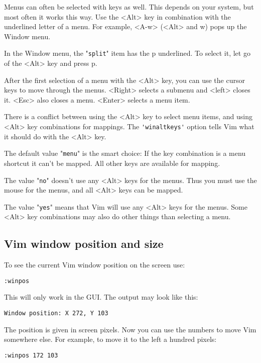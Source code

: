 Menus can often be selected with keys as well.
This depends on your system, but most often it works this way.
Use the <Alt> key in combination with the underlined letter of a menu.
For example, <A-w> (<Alt> and w) pops up the Window menu.

In the Window menu, the "\verb!split!" item has the p underlined.
To select it, let go of the <Alt> key and press p.

After the first selection of a menu with the <Alt> key, you can use the cursor keys to move through the menus.
<Right> selects a submenu and <left> closes it.
<Esc> also closes a menu.
<Enter> selects a menu item.

There is a conflict between using the <Alt> key to select menu items, and using <Alt> key combinations for mappings.
The \verb!'winaltkeys'! option tells Vim what it should do with the <Alt> key.

The default value "\verb!menu!" is the smart choice: If the key combination is a menu shortcut it can't be mapped.
All other keys are available for mapping.

The value "\verb!no!" doesn't use any <Alt> keys for the menus.
Thus you must use the mouse for the menus, and all <Alt> keys can be mapped.

The value "\verb!yes!" means that Vim will use any <Alt> keys for the menus.
Some <Alt> key combinations may also do other things than selecting a menu.
\subsection{Vim window position and size}
To see the current Vim window position on the screen use:

\begin{Verbatim}[samepage=true]
 :winpos
\end{Verbatim}

This will only work in the GUI.
The output may look like this:

\begin{Verbatim}[samepage=true]
    Window position: X 272, Y 103 
\end{Verbatim}

The position is given in screen pixels.
Now you can use the numbers to move Vim somewhere else.
For example, to move it to the left a hundred pixels:

\begin{Verbatim}[samepage=true]
 :winpos 172 103
\end{Verbatim}
 
